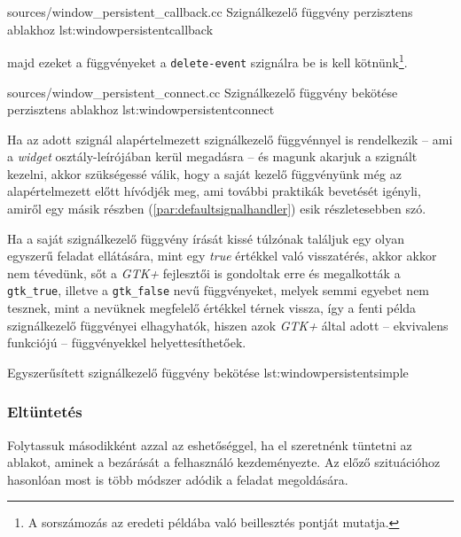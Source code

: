 {sources/window_persistent_callback.cc}
{Szignálkezelő függvény perzisztens ablakhoz}
{lst:windowpersistentcallback}

majd ezeket a függvényeket a \texttt{delete-event} szignálra be is kell kötnünk\footnote{A sorszámozás az eredeti példába való beillesztés pontját mutatja.}.

{sources/window_persistent_connect.cc}
{Szignálkezelő függvény bekötése perzisztens ablakhoz}
{lst:windowpersistentconnect}

Ha az adott szignál alapértelmezett szignálkezelő függvénnyel is rendelkezik -- ami a \textit{widget} osztály-leírójában kerül megadásra -- és magunk akarjuk a szignált kezelni, akkor szükségessé válik, hogy a saját kezelő függvényünk még az alapértelmezett előtt hívódjék meg, ami további praktikák bevetését igényli, amiről egy másik részben (\ref{par:defaultsignalhandler}) esik részletesebben szó.

Ha a saját szignálkezelő függvény írását kissé túlzónak találjuk egy olyan egyszerű feladat ellátására, mint egy \textit{true} értékkel való visszatérés, akkor akkor nem tévedünk, sőt a \textit{GTK+} fejlesztői is gondoltak erre és megalkották a \texttt{gtk\_true}, illetve a \texttt{gtk\_false} nevű függvényeket, melyek semmi egyebet nem tesznek, mint a nevüknek megfelelő értékkel térnek vissza, így a fenti példa szignálkezelő függvényei elhagyhatók, hiszen azok \textit{GTK+} által adott -- ekvivalens funkciójú -- függvényekkel helyettesíthetőek.

{Egyszerűsített szignálkezelő függvény bekötése}
{lst:windowpersistentsimple}

\subsubsection{Eltüntetés}

Folytassuk másodikként azzal az eshetőséggel, ha el szeretnénk tüntetni az ablakot, aminek a bezárását a felhasználó kezdeményezte. Az előző szituációhoz hasonlóan most is több módszer adódik a feladat megoldására.

